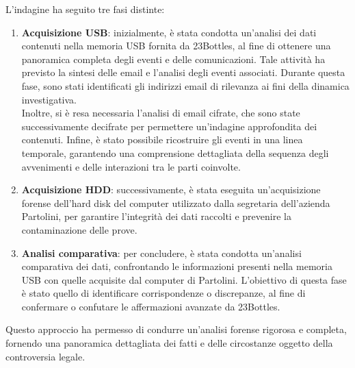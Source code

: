 
L'indagine ha seguito tre fasi distinte:

\begin{enumerate}
    \item \textbf{Acquisizione USB}: inizialmente, è stata condotta un'analisi dei dati contenuti nella memoria USB fornita da 23Bottles, al fine di ottenere una panoramica completa degli eventi e delle comunicazioni. Tale attività ha previsto la sintesi delle email e l'analisi degli eventi associati. Durante questa fase, sono stati identificati gli indirizzi email di rilevanza ai fini della dinamica investigativa.\\Inoltre, si è resa necessaria l'analisi di email cifrate, che sono state successivamente decifrate per permettere un'indagine approfondita dei contenuti. Infine, è stato possibile ricostruire gli eventi in una linea temporale, garantendo una comprensione dettagliata della sequenza degli avvenimenti e delle interazioni tra le parti coinvolte.
    \item \textbf{Acquisizione HDD}: successivamente, è stata eseguita un'acquisizione forense dell'hard disk del computer utilizzato dalla segretaria dell'azienda Partolini, per garantire l'integrità dei dati raccolti e prevenire la contaminazione delle prove.
    \item \textbf{Analisi comparativa}: per concludere, è stata condotta un'analisi comparativa dei dati, confrontando le informazioni presenti nella memoria USB con quelle acquisite dal computer di Partolini. L'obiettivo di questa fase è stato quello di identificare corrispondenze o discrepanze, al fine di confermare o confutare le affermazioni avanzate da 23Bottles.
\end{enumerate}
Questo approccio ha permesso di condurre un'analisi forense rigorosa e completa, fornendo una panoramica dettagliata dei fatti e delle circostanze oggetto della controversia legale.
